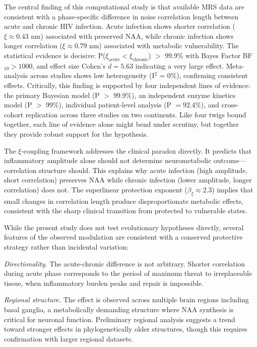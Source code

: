 \documentclass[10pt,a4paper]{article}
\begin{document}
The central finding of this computational study is that available MRS data are consistent with a phase-specific difference in noise correlation length between acute and chronic HIV infection. Acute infection shows shorter correlation ($\xi \approx 0.43$ nm) associated with preserved NAA, while chronic infection shows longer correlation ($\xi \approx 0.79$ nm) associated with metabolic vulnerability. The statistical evidence is decisive: P($\xi_{\text{acute}} < \xi_{\text{chronic}}$) $>$ 99.9\% with Bayes Factor BF$_{10} > 1000$, and effect size Cohen's $d = 5.63$ indicating a very large effect. Meta-analysis across studies shows low heterogeneity (I$^2$ = 0\%), confirming consistent effects. Critically, this finding is supported by four independent lines of evidence: the primary Bayesian model (P $>$ 99.9\%), an independent enzyme kinetics model (P $>$ 99\%), individual patient-level analysis (P $= 92.4\%$), and cross-cohort replication across three studies on two continents. Like four twigs bound together, each line of evidence alone might bend under scrutiny, but together they provide robust support for the hypothesis.

The $\xi$-coupling framework addresses the clinical paradox directly. It predicts that inflammatory amplitude alone should not determine neurometabolic outcome---correlation structure should. This explains why acute infection (high amplitude, short correlation) preserves NAA while chronic infection (lower amplitude, longer correlation) does not. The superlinear protection exponent ($\beta_\xi \approx 2.3$) implies that small changes in correlation length produce disproportionate metabolic effects, consistent with the sharp clinical transition from protected to vulnerable states.

While the present study does not test evolutionary hypotheses directly, several features of the observed modulation are consistent with a conserved protective strategy rather than incidental variation:

\textit{Directionality.} The acute-chronic difference is not arbitrary. Shorter correlation during acute phase corresponds to the period of maximum threat to irreplaceable tissue, when inflammatory burden peaks and repair is impossible.

\textit{Regional structure.} The effect is observed across multiple brain regions including basal ganglia, a metabolically demanding structure where NAA synthesis is critical for neuronal function. Preliminary regional analysis suggests a trend toward stronger effects in phylogenetically older structures, though this requires confirmation with larger regional datasets.
\end{document}
